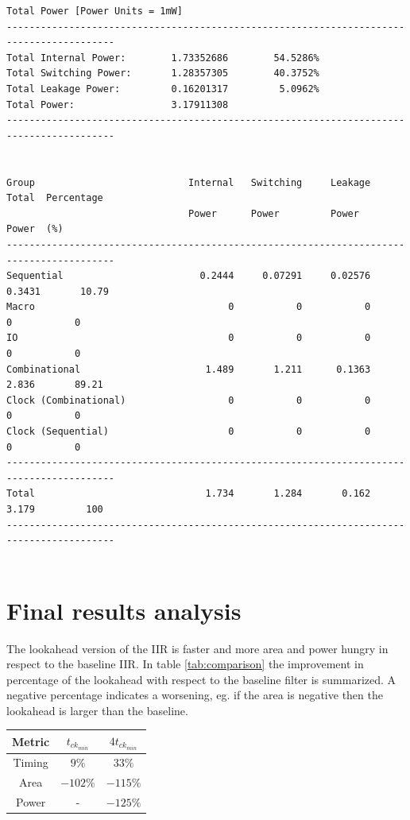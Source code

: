\begin{Verbatim}[fontsize=\footnotesize]
Total Power [Power Units = 1mW]
-----------------------------------------------------------------------------------------
Total Internal Power:        1.73352686 	   54.5286%
Total Switching Power:       1.28357305 	   40.3752%
Total Leakage Power:         0.16201317 	    5.0962%
Total Power:                 3.17911308 
-----------------------------------------------------------------------------------------


Group                           Internal   Switching     Leakage       Total  Percentage 
                                Power      Power         Power         Power  (%)        
-----------------------------------------------------------------------------------------
Sequential                        0.2444     0.07291     0.02576      0.3431       10.79 
Macro                                  0           0           0           0           0 
IO                                     0           0           0           0           0 
Combinational                      1.489       1.211      0.1363       2.836       89.21 
Clock (Combinational)                  0           0           0           0           0 
Clock (Sequential)                     0           0           0           0           0 
-----------------------------------------------------------------------------------------
Total                              1.734       1.284       0.162       3.179         100 
-----------------------------------------------------------------------------------------
    
    \end{Verbatim}

\section{Final results analysis}

The lookahead version of the IIR is faster and more area and power hungry in respect to the baseline IIR.
In table \ref{tab:comparison} the improvement in percentage of the lookahead with respect to the baseline filter
is summarized. A negative percentage indicates a worsening, eg. if the area is negative then the lookahead
is larger than the baseline.

\begin{center}
    \label{tab:comparison}
    \begin{tabular}{ |c|c|c| }
        \hline
        Metric & $t_{ck_{min}}$ & $4t_{ck_{min}}$ \\
        \hline
        Timing & $9\%$ & $33\%$ \\
        \hline
        Area & $-102\%$ & $-115\%$ \\
        \hline
        Power & - & $-125\%$ \\
        \hline
    \end{tabular}
\end{center}

